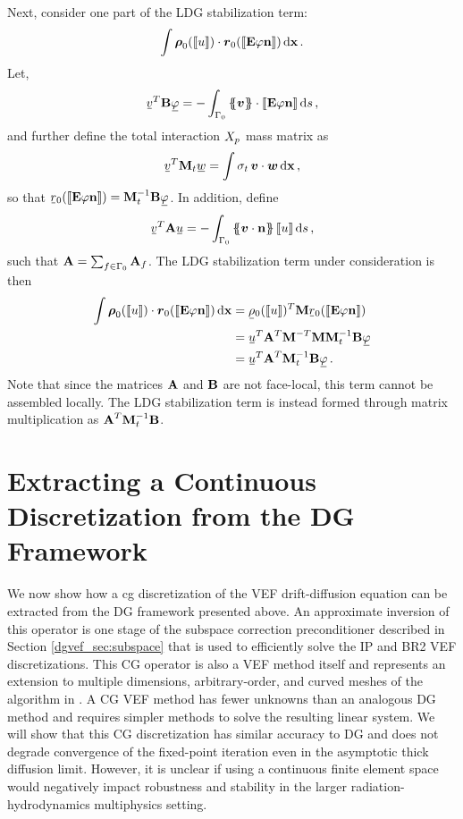 \documentclass[../doc.tex]{subfiles}
\begin{document}
Next, consider one part of the LDG stabilization term: 
	\begin{equation}
		\int \boldsymbol{\rho}_0(\left\llbracket u \right\rrbracket) \cdot \boldsymbol{r}_0(\left\llbracket\boldsymbol{\mathrm{E}}\varphi\boldsymbol{\mathrm{n}} \right\rrbracket) \mathop{}\!\mathrm{d} \boldsymbol{\mathrm{x}} \,. 
	\end{equation}
Let, 
	\begin{equation}
		\ubar{v}^T \mat{B} \ubar{\varphi} = -\int_{\Gamma_0} \avg{\vec{v}}\cdot \jump{\E\varphi\n} \ud s \,,
	\end{equation}
and further define the total interaction $X_p$ mass matrix as 
	\begin{equation}
		\ubar{v}^T \mat{M}_t \ubar{w} = \int \sigma_t\, \vec{v} \cdot \vec{w} \ud \x \,, 
	\end{equation}
so that $\ubar{r}_0\!\paren{\jump{\E\varphi\n}} = \mat{M}_t^{-1} \mat{B} \ubar{\varphi}$. In addition, define 
	\begin{equation}
		\ubar{v}^T \mat{A} \ubar{u} = - \int_{\Gamma_0} \avg{\vec{v}\cdot\n} \jump{u} \ud s \,, 
	\end{equation}
such that $\boldsymbol{\mathrm{A}} = \sum_{f\in\Gamma_0} \boldsymbol{\mathrm{A}}_f$. The LDG stabilization term under consideration is then 
	\begin{equation}
	\begin{aligned}
	 	\int \vec{\rho}_0(\jump{u})\cdot\vec{r}_0\!\paren{\jump{\E\varphi\n}} \ud \x &= \ubar{\rho}_0(\jump{u})^T \mat{M} \ubar{r}_0\!\paren{\jump{\E\varphi\n}} \\
		&= \ubar{u}^T \mat{A}^T \mat{M}^{-T} \mat{M} \mat{M}_t^{-1} \mat{B} \ubar{\varphi} \\
		&= \ubar{u}^T \mat{A}^T\mat{M}_t^{-1}\mat{B} \ubar{\varphi} \,.
	\end{aligned}
	\end{equation} 
Note that since the matrices $\boldsymbol{\mathrm{A}}$ and $\boldsymbol{\mathrm{B}}$ are not face-local, this term cannot be assembled locally. The LDG stabilization term is instead formed through matrix multiplication as $\boldsymbol{\mathrm{A}}^T\boldsymbol{\mathrm{M}}_t^{-1}\boldsymbol{\mathrm{B}}$. 

\section{Extracting a Continuous Discretization from the DG Framework} \label{dgvef_sec:cfem}
We now show how a \gls{cg} discretization of the VEF drift-diffusion equation can be extracted from the DG framework presented above. An approximate inversion of this operator is one stage of the subspace correction preconditioner described in Section \ref{dgvef_sec:subspace} that is used to efficiently solve the IP and BR2 VEF discretizations. This CG operator is also a VEF method itself and represents an extension to multiple dimensions, arbitrary-order, and curved meshes of the algorithm in \cite{two-level-independent-warsa}. A CG VEF method has fewer unknowns than an analogous DG method and requires simpler methods to solve the resulting linear system. We will show that this CG discretization has similar accuracy to DG and does not degrade convergence of the fixed-point iteration even in the asymptotic thick diffusion limit. However, it is unclear if using a continuous finite element space would negatively impact robustness and stability in the larger radiation-hydrodynamics multiphysics setting. 
\end{document}
